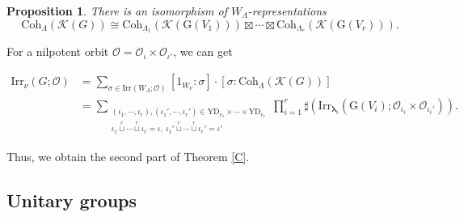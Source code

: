 \documentclass[12pt, a4paper]{amsart}
\numberwithin{equation}{section}
\newtheorem{prop}[thm]{Proposition}
\newcommand{\blam}{{\boldsymbol{\lambda}}}
\newcommand{\CK}{{\mathcal {K}}}
\newcommand{\CO}{{\mathcal {O}}}
\newcommand{\G}{{\mathrm{G}}}
\newcommand{\Irr}{{\mathrm{Irr}}}
\begin{document}
\begin{prop}
    There is an isomorphism of $W_{\Lambda}$-representations
    \begin{equation}
        \mathrm{Coh}_{\Lambda}(\CK(G)) \cong \mathrm{Coh}_{\Lambda_1}(\CK(\G(V_1))) \boxtimes \cdots \boxtimes \mathrm{Coh}_{\Lambda_r}(\CK(\G(V_r))).
    \end{equation}
\end{prop}

For a nilpotent orbit $\CO = \CO_{\iota} \times \CO_{\iota'}$, we can get

\begin{align}
    \Irr_{\nu}(G;\CO) & = \sum_{\sigma \in \Irr(W_{\Lambda};\CO)}[1_{W_\nu}:\sigma]\cdot[\sigma: \mathrm{Coh}_{\Lambda}(\CK(G))]\\
    & = \sum_{\substack{(\iota_1,\cdots,\iota_r), (\iota_1',\cdots,\iota_r') \in \mathrm{YD}_{e_1} \times \cdots \times \mathrm{YD}_{e_r}\\ \iota_1 \mathop{\sqcup}\limits^r \cdots \mathop{\sqcup}\limits^r \iota_r = \iota, \ \iota_1'  \mathop{\sqcup}\limits^r \cdots \mathop{\sqcup}\limits^r \iota_r' = \iota' }} \prod_{i=1}^{r} \sharp(\Irr_{\blam_i}(\G(V_i);\CO_{\iota_i} \times \CO_{\iota_i'})).
\end{align}

Thus, we obtain the second part of Theorem \ref{C}.





\subsection{Unitary groups}
\end{document}
